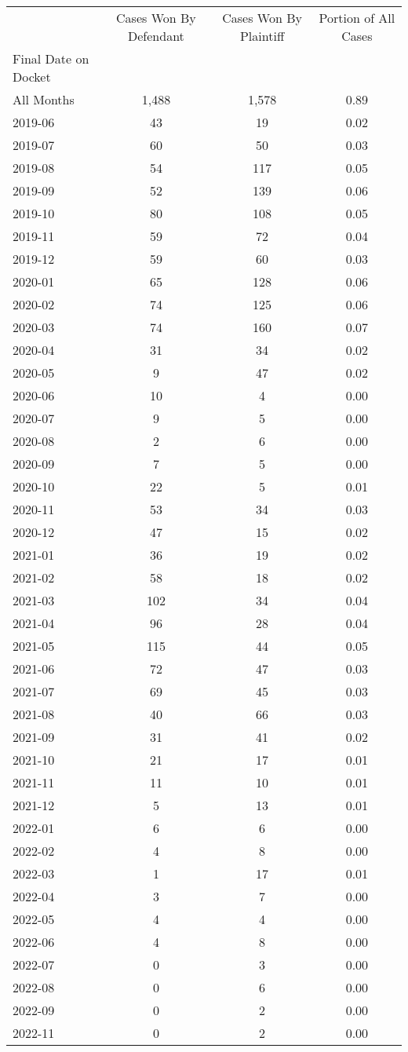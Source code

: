 \begin{tabular}{lccc}
\toprule
 & Cases Won By Defendant & Cases Won By Plaintiff & Portion of All Cases \\
Final Date on Docket &  &  &  \\
\midrule
All Months & 1,488 & 1,578 & 0.89 \\
2019-06 & 43 & 19 & 0.02 \\
2019-07 & 60 & 50 & 0.03 \\
2019-08 & 54 & 117 & 0.05 \\
2019-09 & 52 & 139 & 0.06 \\
2019-10 & 80 & 108 & 0.05 \\
2019-11 & 59 & 72 & 0.04 \\
2019-12 & 59 & 60 & 0.03 \\
2020-01 & 65 & 128 & 0.06 \\
2020-02 & 74 & 125 & 0.06 \\
2020-03 & 74 & 160 & 0.07 \\
2020-04 & 31 & 34 & 0.02 \\
2020-05 & 9 & 47 & 0.02 \\
2020-06 & 10 & 4 & 0.00 \\
2020-07 & 9 & 5 & 0.00 \\
2020-08 & 2 & 6 & 0.00 \\
2020-09 & 7 & 5 & 0.00 \\
2020-10 & 22 & 5 & 0.01 \\
2020-11 & 53 & 34 & 0.03 \\
2020-12 & 47 & 15 & 0.02 \\
2021-01 & 36 & 19 & 0.02 \\
2021-02 & 58 & 18 & 0.02 \\
2021-03 & 102 & 34 & 0.04 \\
2021-04 & 96 & 28 & 0.04 \\
2021-05 & 115 & 44 & 0.05 \\
2021-06 & 72 & 47 & 0.03 \\
2021-07 & 69 & 45 & 0.03 \\
2021-08 & 40 & 66 & 0.03 \\
2021-09 & 31 & 41 & 0.02 \\
2021-10 & 21 & 17 & 0.01 \\
2021-11 & 11 & 10 & 0.01 \\
2021-12 & 5 & 13 & 0.01 \\
2022-01 & 6 & 6 & 0.00 \\
2022-02 & 4 & 8 & 0.00 \\
2022-03 & 1 & 17 & 0.01 \\
2022-04 & 3 & 7 & 0.00 \\
2022-05 & 4 & 4 & 0.00 \\
2022-06 & 4 & 8 & 0.00 \\
2022-07 & 0 & 3 & 0.00 \\
2022-08 & 0 & 6 & 0.00 \\
2022-09 & 0 & 2 & 0.00 \\
2022-11 & 0 & 2 & 0.00 \\
\bottomrule
\end{tabular}
